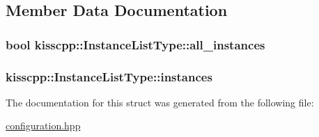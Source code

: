 \subsection{Member Data Documentation}
\hypertarget{a00028_a369b1be877ef96e3b30fbc5e7c1fb429}{
\subsubsection[{all\-\_\-instances}]{\setlength{\rightskip}{0pt plus 5cm}bool kisscpp\-::\-Instance\-List\-Type\-::all\-\_\-instances}}\label{a00028_a369b1be877ef96e3b30fbc5e7c1fb429}
\hypertarget{a00028_ab41a6811d252741bb3000bc13733e19b}{
\subsubsection[{instances}]{ kisscpp\-::\-Instance\-List\-Type\-::instances}}\label{a00028_ab41a6811d252741bb3000bc13733e19b}


The documentation for this struct was generated from the following file\-:\begin{DoxyCompactItemize}
\item 
\hyperlink{a00053}{configuration.\-hpp}\end{DoxyCompactItemize}
